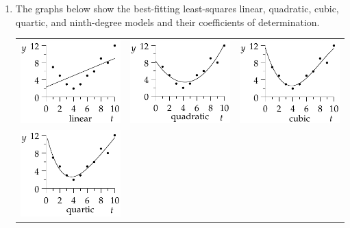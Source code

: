 \begin{exercises}{}{}
\begin{enumerate}
\begin{enumerate}
    \item The graphs below show the best-fitting least-squares linear, quadratic, cubic, quartic, and ninth-degree models and their coefficients of determination.
    \begin{center}
    	\begin{tabular}[t]{@{}c@{\quad}c@{\quad}c@{}}
    		\includegraphics{midterm-reg1}
				&
    		\includegraphics{midterm-reg2}
    		&
    		\includegraphics{midterm-reg3}
    		\\
    		\includegraphics{midterm-reg4}

\end{tabular}
\end{center}
\end{enumerate}
\end{enumerate}
\end{exercises}
